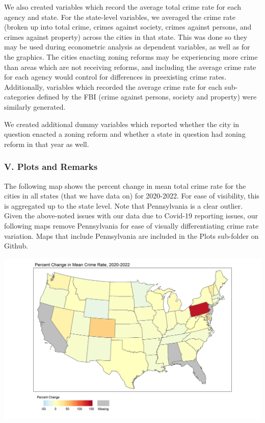 \documentclass[
  12pt,
]{article}
\begin{document}
We also created variables which record the average total crime rate for
each agency and state. For the state-level variables, we averaged the
crime rate (broken up into total crime, crimes against society, crimes
against persons, and crimes against property) across the cities in that
state. This was done so they may be used during econometric analysis as
dependent variables, as well as for the graphics. The cities enacting
zoning reforms may be experiencing more crime than areas which are not
receiving reforms, and including the average crime rate for each agency
would control for differences in preexisting crime rates. Additionally,
variables which recorded the average crime rate for each sub-categories
defined by the FBI (crime against persons, society and property) were
similarly generated.

We created additional dummy variables which reported whether the city in
question enacted a zoning reform and whether a state in question had
zoning reform in that year as well.

\hypertarget{v.-plots-and-remarks}{%
\subsubsection{V. Plots and Remarks}\label{v.-plots-and-remarks}}

The following map shows the percent change in mean total crime rate for
the cities in all states (that we have data on) for 2020-2022. For ease
of visibility, this is aggregated up to the state level. Note that
Pennsylvania is a clear outlier. Given the above-noted issues with our
data due to Covid-19 reporting issues, our following maps remove
Pennsylvania for ease of visually differentiating crime rate variation.
Maps that include Pennsylvania are included in the Plots sub-folder on
Github.

\includegraphics{Plots/States.png}
\end{document}
